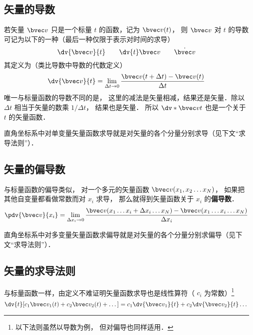 

\subsection{矢量的导数}

若矢量 $\bvec v$ 只是一个标量 $t$ 的函数，记为 $\bvec v(t)$， 则 $\bvec v$ 对 $t$ 的导数可记为以下的一种（最后一种仅限于表示对时间的求导）
\begin{equation}
\dv{\bvec v}{t} \qquad \dv{t}\bvec v \qquad \dot{\bvec v}
\end{equation}
其定义为（类比导数中导数的代数定义）
\begin{equation}
\dv{\bvec v}{t} = \lim_{\Delta t \to 0} \frac{\bvec v ( t + \Delta t) - \bvec v(t)}{\Delta t}
\end{equation}
唯一与标量函数的导数不同的是， 这里的减法是矢量相减，结果还是矢量．除以 $\Delta t$ 相当于矢量的数乘 $1/\Delta t$， 结果也是矢量． 所以 $\dv*{\bvec v}{t}$ 也是一个关于 $t$ 的矢量函数．

直角坐标系中对单变量矢量函数求导就是对矢量的各个分量分别求导（见下文“求导法则”）．

\subsection{矢量的偏导数}
与标量函数的偏导类似， 对一个多元的矢量函数 $\bvec v(x_1, x_2\ldots x_N)$， 如果把其他自变量都看做常数而对 $x_i$ 求导， 那么就得到矢量函数关于 $x_i$ 的\textbf{偏导数}．
\begin{equation}
\pdv{\bvec v}{x_i} = \lim_{\Delta x_i \to 0} \frac{\bvec v(x_1 \ldots x_i+\Delta x_i\ldots x_N) -  \bvec v(x_1 \ldots x_i\ldots x_N)}{\Delta x_i}
\end{equation}

直角坐标系中对多变量矢量函数求偏导就是对矢量的各个分量分别求偏导（见下文“求导法则”）．

\subsection{矢量的求导法则}
与标量函数一样，由定义不难证明矢量函数求导也是线性算符（ $c_i$ 为常数）\footnote{以下法则虽然以导数为例， 但对偏导也同样适用．}
\begin{equation}
\dv{t}[c_1 \bvec v_1(t) + c_2 \bvec v_2(t) + \dots] = c_1\dv{\bvec v_1}{t} + c_2\dv{\bvec v_2}{t} \dots
\end{equation}

